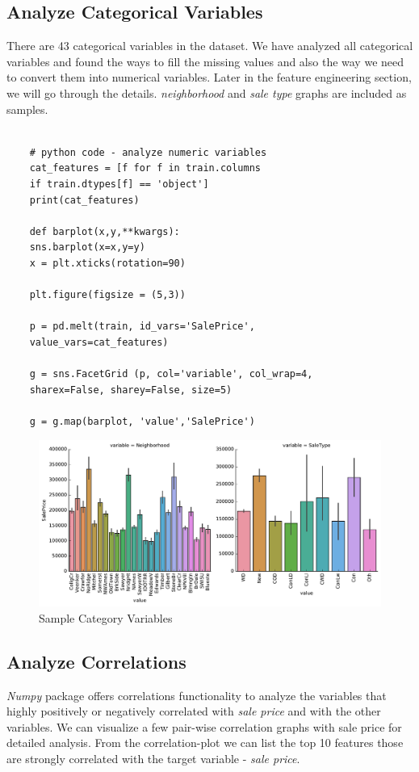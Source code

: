 \documentclass[sigconf]{acmart}
\begin{document}
	\subsection{Analyze Categorical Variables}
	There are 43 categorical variables in the dataset. We have analyzed all categorical variables and found the ways to fill the missing values and also the way we need to convert them into numerical variables. Later in the feature engineering section, we will go through the details. {\em neighborhood} and {\em sale type} graphs are included as samples.
	\begin{verbatim}
	
	# python code - analyze numeric variables
	cat_features = [f for f in train.columns 
	if train.dtypes[f] == 'object']
	print(cat_features)
	
	def barplot(x,y,**kwargs):
	sns.barplot(x=x,y=y)
	x = plt.xticks(rotation=90)
	
	plt.figure(figsize = (5,3))
	
	p = pd.melt(train, id_vars='SalePrice',
	value_vars=cat_features)
	
	g = sns.FacetGrid (p, col='variable', col_wrap=4, 
	sharex=False, sharey=False, size=5)
	
	g = g.map(barplot, 'value','SalePrice')				
	\end{verbatim}
	
	\begin{figure}[H]
		\centering
		\includegraphics[width=1.0\columnwidth]{images/cat_features_1}	
		\caption{Sample Category Variables} \label{fig:cat_features_1} 
	\end{figure}
	
	\subsection{Analyze Correlations}		
	{\em Numpy} package offers correlations functionality to analyze the variables that highly positively or negatively correlated with {\em sale price} and with the other variables. We can  visualize a few pair-wise correlation graphs with sale price for detailed analysis. From the correlation-plot we can list the top 10 features those are strongly correlated with the target variable - {\em sale price}.
	
\end{document}
